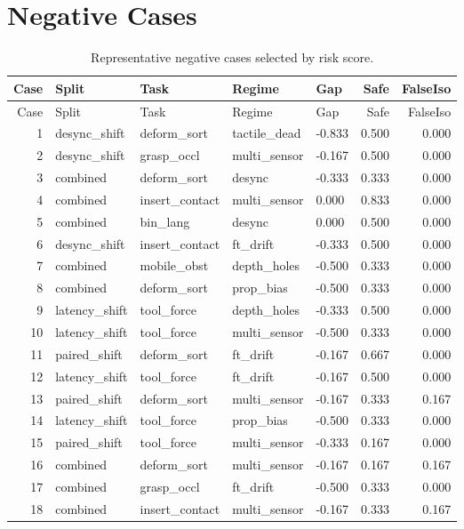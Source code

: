 \documentclass{article}
\begin{document}
\section{Negative Cases}
\begin{longtable}{@{}rllllrr@{}}
\caption{Representative negative cases selected by risk score.}\\
\toprule
Case & Split & Task & Regime & Gap & Safe & FalseIso\\
\midrule
\endfirsthead
\toprule
Case & Split & Task & Regime & Gap & Safe & FalseIso\\
\midrule
\endhead
1 & desync\_shift & deform\_sort & tactile\_dead & -0.833 & 0.500 & 0.000 \\
2 & desync\_shift & grasp\_occl & multi\_sensor & -0.167 & 0.500 & 0.000 \\
3 & combined & deform\_sort & desync & -0.333 & 0.333 & 0.000 \\
4 & combined & insert\_contact & multi\_sensor & 0.000 & 0.833 & 0.000 \\
5 & combined & bin\_lang & desync & 0.000 & 0.500 & 0.000 \\
6 & desync\_shift & insert\_contact & ft\_drift & -0.333 & 0.500 & 0.000 \\
7 & combined & mobile\_obst & depth\_holes & -0.500 & 0.333 & 0.000 \\
8 & combined & deform\_sort & prop\_bias & -0.500 & 0.333 & 0.000 \\
9 & latency\_shift & tool\_force & depth\_holes & -0.333 & 0.500 & 0.000 \\
10 & latency\_shift & tool\_force & multi\_sensor & -0.500 & 0.333 & 0.000 \\
11 & paired\_shift & deform\_sort & ft\_drift & -0.167 & 0.667 & 0.000 \\
12 & latency\_shift & tool\_force & ft\_drift & -0.167 & 0.500 & 0.000 \\
13 & paired\_shift & deform\_sort & multi\_sensor & -0.167 & 0.333 & 0.167 \\
14 & latency\_shift & tool\_force & prop\_bias & -0.500 & 0.333 & 0.000 \\
15 & paired\_shift & tool\_force & multi\_sensor & -0.333 & 0.167 & 0.000 \\
16 & combined & deform\_sort & multi\_sensor & -0.167 & 0.167 & 0.167 \\
17 & combined & grasp\_occl & ft\_drift & -0.500 & 0.333 & 0.000 \\
18 & combined & insert\_contact & multi\_sensor & -0.167 & 0.333 & 0.167 \\

\end{longtable}
\end{document}
